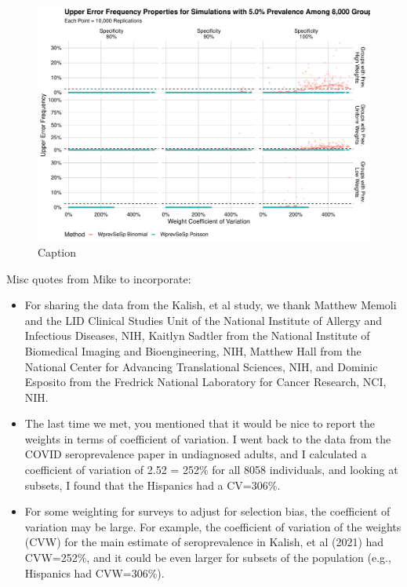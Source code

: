 \documentclass[AMA,STIX1COL]{WileyNJD-v2}
\begin{document}
\begin{figure}
    \centering
    \includegraphics[width=\textwidth]{figures/imperfect_upper_error_frequency_8000_0_05_reduced.pdf}
    \caption{Caption}
    \label{fig:imperfect_upper_error_frequency_8000_0_05_reduced.pdf}
\end{figure}

Misc quotes from Mike to incorporate:

\begin{itemize}
    \item For sharing the data from the Kalish, et al study, we thank Matthew Memoli and the LID Clinical Studies Unit of the National Institute of Allergy and Infectious Diseases, NIH,  Kaitlyn Sadtler from the National Institute of Biomedical Imaging and Bioengineering, NIH,   Matthew Hall from the National Center for Advancing Translational Sciences, NIH, and Dominic Esposito from the Fredrick National Laboratory for Cancer Research, NCI, NIH.
    \item The last time we met, you mentioned that it would be nice to report the weights in terms of coefficient of variation. I went back to the data from the COVID seroprevalence paper in undiagnosed adults, and I calculated a coefficient of variation  of 2.52 = 252\% for all 8058 individuals, and looking at subsets, I found that the Hispanics had a CV=306\%.  
    \item For some weighting for surveys to adjust for selection bias, the coefficient of variation may be large.  For example, the coefficient of variation of the weights (CVW) for the main estimate of seroprevalence in Kalish, et al (2021) had CVW=252\%, and it could be even larger for subsets of the population (e.g., Hispanics had CVW=306\%). 
\end{itemize}
\end{document}
